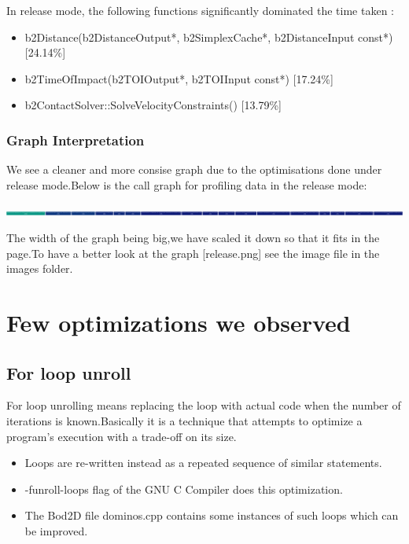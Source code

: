 \documentclass[11pt]{article}
\begin{document}
In release mode, the following functions significantly dominated the time taken :
\begin{itemize}
\item b2Distance(b2DistanceOutput*, b2SimplexCache*, b2DistanceInput const*) [24.14\%]
\item b2TimeOfImpact(b2TOIOutput*, b2TOIInput const*) [17.24\%]
\item b2ContactSolver::SolveVelocityConstraints() [13.79\%] 
\end{itemize}
\subsubsection{Graph Interpretation}

We see a cleaner and more consise graph due to the optimisations done under release mode.Below is the call graph for profiling data in the release mode:

 \begin{center}
\includegraphics[scale=0.08]
{images/release.png}
\end{center}
The width of the graph being big,we have scaled it down so that it fits in the page.To have a better look at the graph [release.png] see the image file in the images folder.

\section{Few optimizations we observed}
\subsection{For loop unroll}
For loop unrolling means replacing the loop with actual code when the number of iterations is known.Basically it is a technique that attempts to optimize a program's execution with a trade-off on its size.\\
\begin{itemize}
\item Loops are re-written instead as a repeated sequence of similar statements.
\item -funroll-loops flag of the GNU C Compiler does this optimization.
\item The Bod2D file dominos.cpp contains some instances of such loops which can be improved.
\end{itemize}
\end{document}
